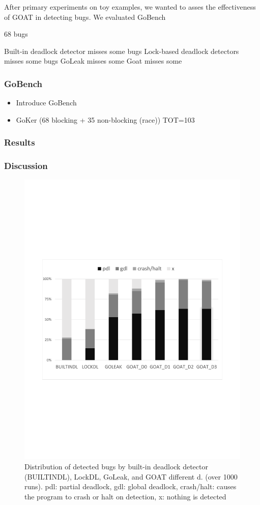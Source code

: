After primary experiments on toy examples, we wanted to asses the effectiveness of GOAT in detecting bugs.
%
We evaluated GoBench

68 bugs

Built-in deadlock detector misses some bugs
Lock-based deadlock detectors misses some bugs
GoLeak misses some
Goat misses some

\subsubsection{GoBench}
\label{sec:gobench}
\begin{itemize}
  \item Introduce GoBench
  \item GoKer (68 blocking + 35 non-blocking (race)) TOT=103
\end{itemize}
\subsubsection{Results}
\label{sec:results}

\subsubsection{Discussion}
\label{discussion}


\begin{figure}
\centering
  \includegraphics[width=.95\linewidth]{figs/P4_detections.pdf}
  \caption{Distribution of detected bugs by built-in deadlock detector (BUILTINDL), LockDL, GoLeak, and GOAT different d. (over 1000 runs). pdl: partial deadlock, gdl: global deadlock, crash/halt: causes the program to crash or halt on detection, x: nothing is detected }
  \label{fig:detection}
\end{figure}


